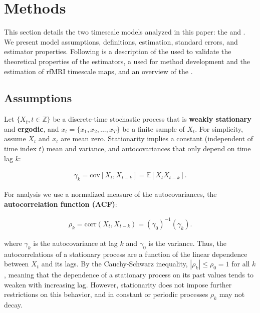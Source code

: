 \documentclass[main.tex]{subfiles}
\begin{document}
\section{Methods}

This section details the two timescale models analyzed in this paper: the  and . We present model assumptions, definitions, estimation, standard errors, and estimator properties. Following is a description of the  used to validate the theoretical properties of the estimators, a  used for method development and the estimation of rfMRI timescale maps, and an overview of the .

\subsection{Assumptions} \label{sec:assumptions}

Let $\{X_t, t\in \mathbb{Z}\}$ be a discrete-time stochastic process that is \textbf{weakly stationary} and \textbf{ergodic}, and $x_t = \{x_1, x_2, ..., x_T\}$ be a finite sample of $X_t$. For simplicity, assume $X_t$ and $x_t$ are mean zero. Stationarity implies a constant (independent of time index $t$) mean and variance, and autocovariances that only depend on time lag $k$:

\begin{align} 
    \gamma_k = \text{cov}[X_t, X_{t-k}] = \mathbb{E}[X_t X_{t-k}].
\end{align}

\noindent For analysis we use a normalized measure of the autocovariances, the \textbf{autocorrelation function (ACF)}:

\begin{align} \label{eq:acf}
\rho_k = \text{corr}(X_t, X_{t-k}) = (\gamma_0)^{-1}(\gamma_k).
\end{align}

\noindent where $\gamma_k$ is the autocovariance at lag $k$ and $\gamma_0$ is the variance. Thus, the autocorrelations of a stationary process are a function of the linear dependence between $X_t$ and its lags. By the Cauchy-Schwarz inequality, $|\rho_k|\le \rho_0 = 1$ for all $k$, meaning that the dependence of a stationary process on its past values tends to weaken with increasing lag. However, stationarity does not impose further restrictions on this behavior, and in constant or periodic processes $\rho_k$ may not decay. \\
\end{document}
